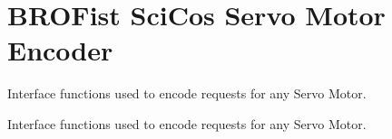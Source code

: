 \hypertarget{group___b_r_o_cos_mot_enc}{
\section{BROFist SciCos Servo Motor Encoder}
\label{group___b_r_o_cos_mot_enc}
}


Interface functions used to encode requests for any Servo Motor.  


Interface functions used to encode requests for any Servo Motor. 